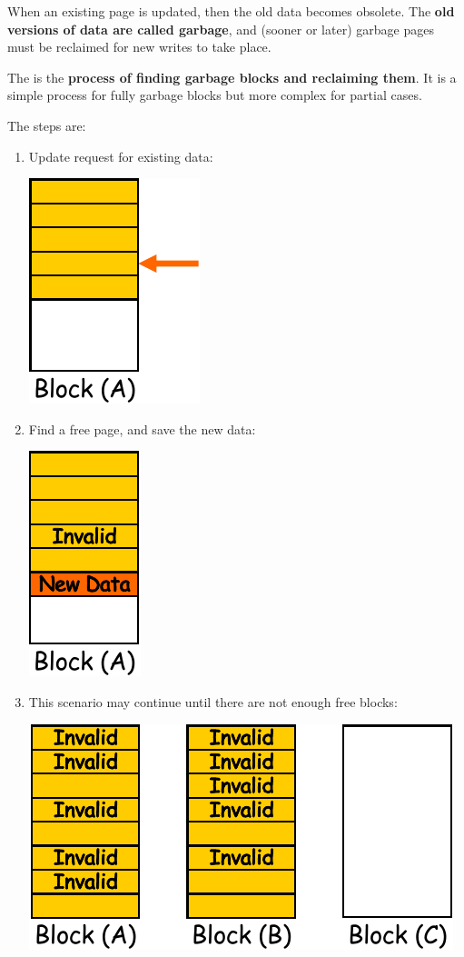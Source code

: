 \noindent
When an existing page is updated, then the old data becomes obsolete. The \textbf{old versions of data are called garbage}, and (sooner or later) garbage pages must be reclaimed for new writes to take place.

\highspace
The  is the \textbf{process of finding garbage blocks and reclaiming them}. It is a simple process for fully garbage blocks but more complex for partial cases.

\begin{examplebox}
    The steps are:
    \begin{enumerate}
        \item Update request for existing data:
        \begin{center}
            \includegraphics[width=.24\textwidth]{img/garbage-collection-1.pdf}
        \end{center}

        \item Find a free page, and save the new data:
        \begin{center}
            \includegraphics[width=.15\textwidth]{img/garbage-collection-2.pdf}
        \end{center}

        \item This scenario may continue until there are not enough free blocks:
        \begin{center}
            \includegraphics[width=.5\textwidth]{img/garbage-collection-3.pdf}
        \end{center}


\end{enumerate}
\end{examplebox}
